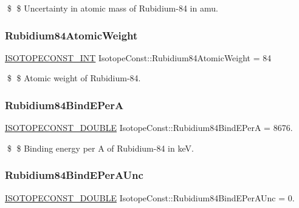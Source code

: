 \$ \$ Uncertainty in atomic mass of Rubidium-\/84 in amu. \mbox{\label{group___isotope_const-_rubidium-_rb84_ga4fa71c26608fe4afd73e0b254ae99f50}} 
\subsubsection{\texorpdfstring{Rubidium84\+Atomic\+Weight}{Rubidium84AtomicWeight}}
{\footnotesize\ttfamily \mbox{\hyperlink{group___isotope_const-_macros_ga5f18360b3e99483a35c32d789e62621c}{I\+S\+O\+T\+O\+P\+E\+C\+O\+N\+S\+T\+\_\+\+I\+NT}} Isotope\+Const\+::\+Rubidium84\+Atomic\+Weight = 84}

\$ \$ Atomic weight of Rubidium-\/84. \mbox{\label{group___isotope_const-_rubidium-_rb84_ga6fcca4828f25e7ec83de5d6e584c3289}} 
\subsubsection{\texorpdfstring{Rubidium84\+Bind\+E\+PerA}{Rubidium84BindEPerA}}
{\footnotesize\ttfamily \mbox{\hyperlink{group___isotope_const-_macros_ga8f45a7272ce02c0b4c65c44636ed719a}{I\+S\+O\+T\+O\+P\+E\+C\+O\+N\+S\+T\+\_\+\+D\+O\+U\+B\+LE}} Isotope\+Const\+::\+Rubidium84\+Bind\+E\+PerA = 8676.}

\$ \$ Binding energy per A of Rubidium-\/84 in keV. \mbox{\label{group___isotope_const-_rubidium-_rb84_ga8e06eb44ae3c630babc522111514312b}} 
\subsubsection{\texorpdfstring{Rubidium84\+Bind\+E\+Per\+A\+Unc}{Rubidium84BindEPerAUnc}}
{\footnotesize\ttfamily \mbox{\hyperlink{group___isotope_const-_macros_ga8f45a7272ce02c0b4c65c44636ed719a}{I\+S\+O\+T\+O\+P\+E\+C\+O\+N\+S\+T\+\_\+\+D\+O\+U\+B\+LE}} Isotope\+Const\+::\+Rubidium84\+Bind\+E\+Per\+A\+Unc = 0.}

